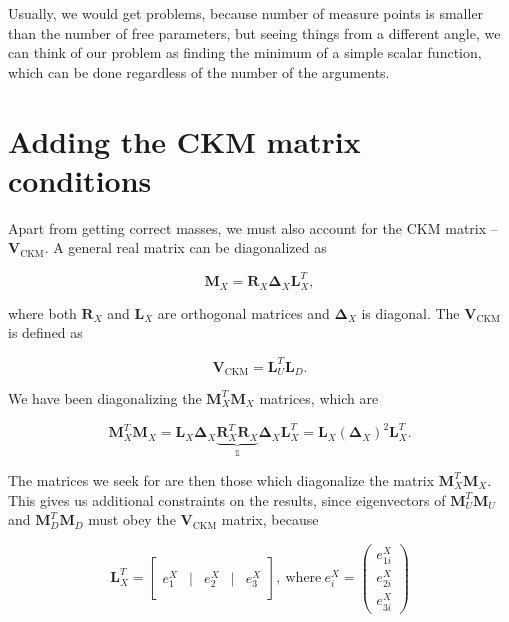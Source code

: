 \documentclass[12pt, a4paper]{article}
\renewcommand{\ni}{
	\noindent
}
\newcommand{\M}{
	\ensuremath{\mathbf{M}}
}
\newcommand{\De}{
	\ensuremath{\mathbf{\Delta}}
}
\newcommand{\I}{
	\ensuremath{\mathds{1}}
}
\newcommand{\R}{
	\ensuremath{\mathbf{R}}
}
\newcommand{\Le}{
	\ensuremath{\mathbf{L}}
}
\newcommand{\V}{
	\ensuremath{\mathbf{V}}
}
\begin{document}
Usually, we would get problems, because number of measure points is smaller than the number of free parameters,
but seeing things from a different angle, we can think of our problem as finding the minimum of a simple scalar
function, which can be done regardless of the number of the arguments.

\section{Adding the CKM matrix conditions}

Apart from getting correct masses, we must also account for the CKM matrix -- $\V_\text{CKM}$. A general real matrix
can be diagonalized as

\begin{equation}
	\M_X = \R_X \De_X \Le_X^T,
\end{equation}

\ni where both $\R_X$ and $\Le_X$ are orthogonal matrices and $\De_X$ is diagonal. The $\V_\text{CKM}$ is defined as

\begin{equation}
	\V_\text{CKM} = \Le_U^T\Le_D.
\end{equation}

\ni We have been diagonalizing the $\M_X^T \M_X$ matrices, which are

\begin{equation}
	\M_X^T \M_X = \Le_X \De_X \underbrace{\R_X^T \R_X}_{\I} \De_X \Le_X^T = \Le_X (\De_X)^2 \Le_X^T.
\end{equation}

\ni The matrices we seek for are then those which diagonalize the matrix $\M^T_X \M_X$. This gives us additional constraints
on the results, since eigenvectors of $\M_U^T\M_U$ and $\M_D^T\M_D$ must obey the $\V_\text{CKM}$ matrix, because

\begin{equation}
	\Le_X^T = \begin{bmatrix}
			    & & & & \\
			e^X_1 &\Bigg|& e^X_2 &\Bigg|& e^X_3\\
			    & & & &
		\end{bmatrix},\ \text{where}\ e_i^X = \begin{pmatrix}
			e^X_{1i} \\ e^X_{2i} \\ e^X_{3i}
		\end{pmatrix}
\end{equation}
\end{document}
